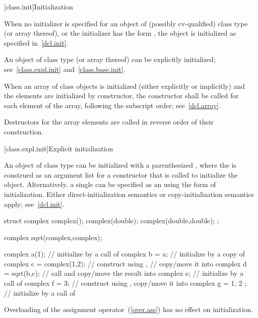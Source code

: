 [class.init]{Initialization}%
%
%

\pnum
When no initializer is specified for an object of (possibly
cv-qualified) class type (or array thereof), or the initializer has
the form
\tcode{()},
the object is initialized as specified in~\ref{dcl.init}.

\pnum
An object of class type (or array thereof) can be explicitly initialized;
see~\ref{class.expl.init} and~\ref{class.base.init}.

\pnum
{}%
When an array of class objects is initialized
(either explicitly or implicitly) and the elements are initialized by constructor,
the constructor shall be called for each element of the array,
following the subscript order; see~\ref{dcl.array}.
\begin{note}
Destructors for the array elements are called in reverse order of their
construction.
\end{note}

[class.expl.init]{Explicit initialization}%
%
%

\pnum
An object of class type can be initialized with a parenthesized
,
where the
is construed as an argument list for a constructor
that is called to initialize the object.
Alternatively, a single
can be specified as an
using the
\tcode{=}
form of initialization.
Either direct-initialization semantics or copy-initialization semantics apply;
see~\ref{dcl.init}.
%
\begin{example}
\begin{codeblock}
struct complex {
  complex();
  complex(double);
  complex(double,double);
};

complex sqrt(complex,complex);

complex a(1);                   // initialize by a call of 
complex b = a;                  // initialize by a copy of 
complex c = complex(1,2);       // construct  using ,
                                // copy/move it into 
complex d = sqrt(b,c);          // call  and copy/move the result into 
complex e;                      // initialize by a call of 
complex f = 3;                  // construct  using , copy/move it into 
complex g = { 1, 2 };           // initialize by a call of 
\end{codeblock}
\end{example}
\begin{note}
%
Overloading of the assignment operator~(\ref{over.ass})
has no effect on initialization.
\end{note}

